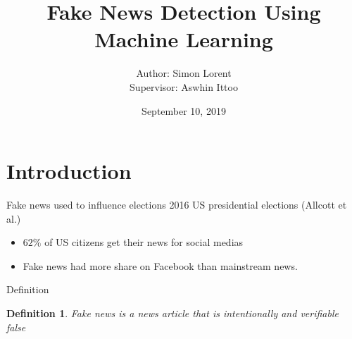 \documentclass{beamer}
\title{Fake News Detection Using Machine Learning}
\date{September 10, 2019}
\author{Author: Simon Lorent \\ Supervisor: Aswhin Ittoo}
\institute{University Of Liège}
\begin{document}
  \maketitle
  \section{Introduction}

  \begin{frame}{Fake news used to influence elections}
  2016 US presidential elections (Allcott et al.)\cite{Allcott2017}
	  \begin{itemize}
	 \item $62\%$ of US citizens get their news for social medias\cite{gottfried2016news}
	 \item Fake news had more share on Facebook than mainstream news\cite{silverman2016teens}.
	\end{itemize}
  \end{frame}

  \begin{frame}{Definition}
  \newtheorem{def:fake_news}{Definition}
	\begin{def:fake_news}
	Fake news is a news article that is intentionally and verifiable false\cite{shu2017fake}
	\end{def:fake_news}
  \end{frame}
\end{document}

